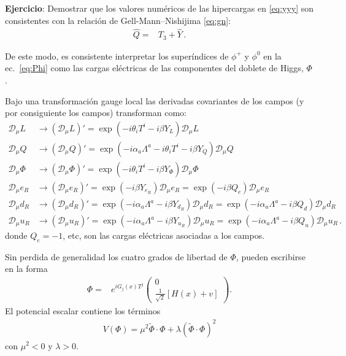 \begin{frame}
\noindent
\textbf{Ejercicio}: Demostrar que los valores numéricos de las hipercargas en \eqref{eq:yyy} son consistentes con la relación de Gell-Mann--Nishijima \eqref{eq:gn}:
\begin{align}
 \widehat{Q}=&T_3+\widehat{Y}\,.
\end{align}

De este modo, es consistente interpretar los superíndices de $\phi^+$ y $\phi^0$ en la ec.~\eqref{eq:Phi} como las cargas eléctricas de las componentes del doblete de Higgs, $\Phi$.

Bajo una transformación gauge local las derivadas covariantes de los campos (y por consiguiente los campos) transforman como:
\begin{align}
  \mathcal{D}_\mu L&\to\left(\mathcal{D}_\mu L\right)'=\exp\left(-i\theta_iT^i-i\beta Y_L\right)\mathcal{D}_\mu L\nonumber\\
  \mathcal{D}_\mu Q&\to\left(\mathcal{D}_\mu Q\right)'=\exp\left(-i\alpha_a\Lambda^a-i\theta_iT^i-i\beta Y_Q\right)\mathcal{D}_\mu Q\nonumber\\
  \mathcal{D}_\mu \Phi&\to\left(\mathcal{D}_\mu \Phi\right)'=\exp\left(-i\theta_iT^i-i\beta Y_\Phi\right)\mathcal{D}_\mu \Phi\nonumber\\
  \mathcal{D}_\mu e_R&\to\left(\mathcal{D}_\mu e_R\right)'=\exp\left(-i\beta Y_{e_R}\right)\mathcal{D}_\mu e_R=\exp\left(-i\beta Q_{e}\right)\mathcal{D}_\mu e_R\nonumber\\
  \mathcal{D}_\mu d_R&\to\left(\mathcal{D}_\mu d_R\right)'=\exp\left(-i\alpha_a\Lambda^a-i\beta Y_{d_R}\right)\mathcal{D}_\mu d_R=\exp\left(-i\alpha_a\Lambda^a-i\beta Q_{d}\right)\mathcal{D}_\mu d_R\nonumber\\
  \mathcal{D}_\mu u_R&\to\left(\mathcal{D}_\mu u_R\right)'=\exp\left(-i\alpha_a\Lambda^a-i\beta Y_{u_R}\right)\mathcal{D}_\mu u_R=\exp\left(-i\alpha_a\Lambda^a-i\beta Q_{u}\right)\mathcal{D}_\mu u_R\,.
\end{align}
donde $Q_{e}=-1$, etc, son las cargas eléctricas asociadas a los campos.


Sin perdida de generalidad los cuatro grados de libertad de $\Phi$, pueden escribirse en la forma
\begin{align}
\label{eq:polarhiggs}
  {\Phi}=&e^{i G_j(x)T^j}
  \begin{pmatrix}
    0\\
    \frac{1}{\sqrt{2}}[H(x)+v]
  \end{pmatrix}.
\end{align}
El potencial escalar contiene los términos
\begin{align}
  V(\Phi)=\mu^2\widetilde{\Phi}\cdot\Phi+\lambda \left( \widetilde{\Phi}\cdot\Phi \right)^2 
\end{align}
con $\mu^2<0$ y $\lambda>0$. %

\end{frame}
